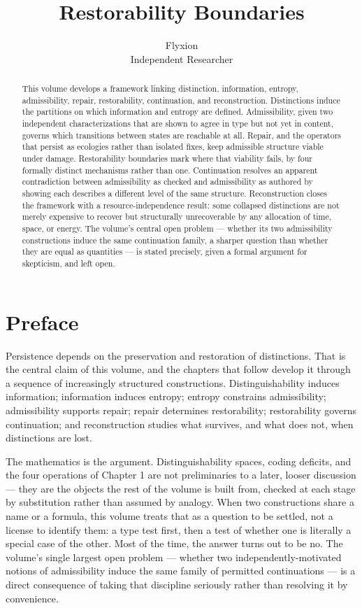 \documentclass[12pt]{report}
\title{Restorability Boundaries}
\author{Flyxion \\ \small Independent Researcher}
\date{}
\begin{document}
\maketitle

\begin{abstract}
\noindent
This volume develops a framework linking distinction, information,
entropy, admissibility, repair, restorability, continuation, and
reconstruction. Distinctions induce the partitions on which information
and entropy are defined. Admissibility, given two independent
characterizations that are shown to agree in type but not yet in
content, governs which transitions between states are reachable at all.
Repair, and the operators that persist as ecologies rather than isolated
fixes, keep admissible structure viable under damage. Restorability
boundaries mark where that viability fails, by four formally distinct
mechanisms rather than one. Continuation resolves an apparent
contradiction between admissibility as checked and admissibility as
authored by showing each describes a different level of the same
structure. Reconstruction closes the framework with a resource-independence
result: some collapsed distinctions are not merely expensive to recover
but structurally unrecoverable by any allocation of time, space, or
energy. The volume's central open problem --- whether its two
admissibility constructions induce the same continuation family, a
sharper question than whether they are equal as quantities --- is stated
precisely, given a formal argument for skepticism, and left open.
\end{abstract}

\chapter*{Preface}

Persistence depends on the preservation and restoration of distinctions.
That is the central claim of this volume, and the chapters that follow
develop it through a sequence of increasingly structured constructions.
Distinguishability induces information; information induces entropy;
entropy constrains admissibility; admissibility supports repair; repair
determines restorability; restorability governs continuation; and
reconstruction studies what survives, and what does not, when
distinctions are lost.

The mathematics is the argument. Distinguishability spaces, coding
deficits, and the four operations of Chapter 1 are not preliminaries to
a later, looser discussion --- they are the objects the rest of the
volume is built from, checked at each stage by substitution rather than
assumed by analogy. When two constructions share a name or a formula,
this volume treats that as a question to be settled, not a license to
identify them: a type test first, then a test of whether one is
literally a special case of the other. Most of the time, the answer
turns out to be no. The volume's single largest open problem --- whether
two independently-motivated notions of admissibility induce the same
family of permitted continuations --- is a direct consequence of taking
that discipline seriously rather than resolving it by convenience.
\end{document}
